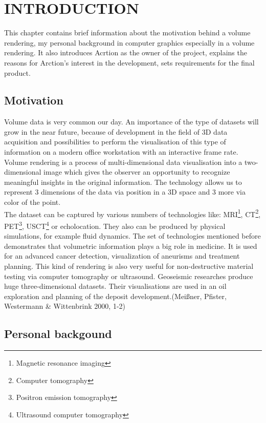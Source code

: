 \documentclass[twoside, english, 11pt]{report}
\begin{document}
\newpage

\tableofcontents

\chapter{INTRODUCTION}
This chapter contains brief information about the motivation behind a volume rendering, my personal background in computer graphics especially in a volume rendering. It also introduces Acrtion as the owner of the project, explains the reasons for Arction's interest in the development, sets requirements for the final product.
\section{Motivation}

Volume data is very common our day. An importance of the type of datasets will grow in the near future, because of development in the field of 3D data acquisition and possibilities to perform the visualisation of this type of information on a modern office workstation with an interactive frame rate.\\

Volume rendering is a process of multi-dimensional data visualisation into a two-dimensional image which gives the observer an opportunity to recognize meaningful insights in the original information. The technology allows us to represent 3 dimensions of the data via position in a 3D space and 3 more via color of the point.\\

The dataset can be captured by various numbers of technologies like: MRI\footnote{Magnetic resonance imaging}, CT\footnote{Computer tomography}, PET\footnote{Positron emission tomography}, USCT\footnote{Ultrasound computer tomography} or echolocation. They also can be produced by physical simulations, for example fluid dynamics. The set of technologies mentioned before demonstrates that volumetric information plays a big role in medicine. It is used for an advanced cancer detection, visualization of aneurisms and treatment planning. This kind of rendering is also very useful for non-destructive material testing via computer tomography or ultrasound. Geoseismic researches produce huge three-dimensional datasets. Their visualisations are used in an oil exploration and planning of the deposit development.(Meißner, Pfister, Westermann \& Wittenbrink 2000, 1-2)\\


\section{Personal backgound}
\end{document}
